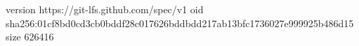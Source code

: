 version https://git-lfs.github.com/spec/v1
oid sha256:01cf8bd0cd3cb0bddf28c017626bddbdd217ab13bfc1736027e999925b486d15
size 626416
